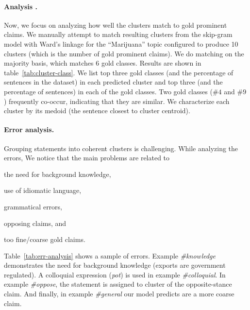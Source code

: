 \paragraph{Analysis .} 
Now, we focus on analyzing how well the clusters match to gold 
prominent claims. 
We manually attempt to match resulting clusters from 
the skip-gram model with Ward's linkage for the ``Marijuana'' topic configured
to produce 10 clusters (which is the number of gold prominent claims). 
We do matching on the majority basis, which matches 6 gold classes. 
Results are shown in table~\ref{tab:cluster-class}. 
We list top three gold classes (and the percentage of sentences in the dataset) 
in each predicted cluster and top three
(and the percentage of sentences) in each of the gold classes. 
Two gold classes  ($\#4$ and $\#9$) frequently co-occur, indicating 
that they are similar. 
We characterize each cluster by its medoid (the sentence closest to cluster centroid).

\paragraph{Error analysis.}
Grouping statements into coherent clusters is challenging. 
While analyzing the errors, We notice that the main problems are related to 
\begin{enumerate*}[label=(\arabic*)]
\item the need for background knowledge, 
\item use of idiomatic language, 
\item grammatical errors, 
\item opposing claims, and 
\item too fine/coarse gold claims.
\end{enumerate*}
Table~\ref{tab:err-analysis} shows a sample of errors. 
Example \emph{\#knowledge} demonstrates the need for background knowledge 
(exports are government regulated). 
A colloquial expression (\emph{pot}) is used in example \emph{\#colloquial}. 
In example \emph{\#oppose}, the statement is assigned to cluster of the opposite-stance
claim. 
And finally, in example \emph{\#general} our model predicts are a more coarse claim. 

